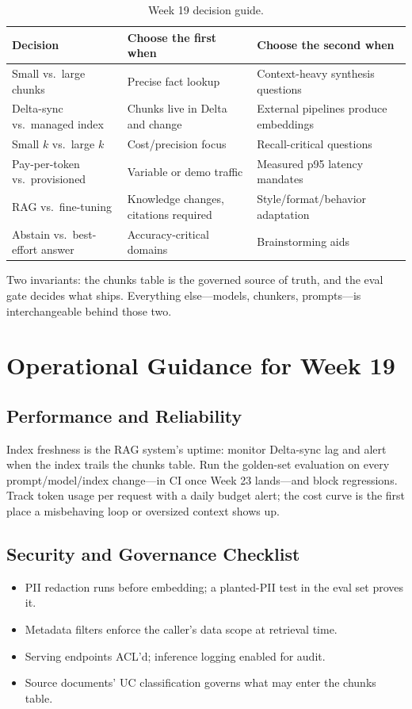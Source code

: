 \begin{table}[H]
\centering
\small
\begin{tabular}{@{}p{3.4cm}p{4.4cm}p{4.6cm}@{}}
\toprule
\textbf{Decision} & \textbf{Choose the first when} & \textbf{Choose the second when} \\
\midrule
Small vs.\ large chunks & Precise fact lookup & Context-heavy synthesis questions \\
Delta-sync vs.\ managed index & Chunks live in Delta and change & External pipelines produce embeddings \\
Small $k$ vs.\ large $k$ & Cost/precision focus & Recall-critical questions \\
Pay-per-token vs.\ provisioned & Variable or demo traffic & Measured p95 latency mandates \\
RAG vs.\ fine-tuning & Knowledge changes, citations required & Style/format/behavior adaptation \\
Abstain vs.\ best-effort answer & Accuracy-critical domains & Brainstorming aids \\
\bottomrule
\end{tabular}
\caption{Week 19 decision guide.}
\label{tab:ch19-decisions}
\end{table}

Two invariants: the chunks table is the governed source of truth, and the eval gate decides what ships. Everything else---models, chunkers, prompts---is interchangeable behind those two.

\section{Operational Guidance for Week 19}
%
\subsection{Performance and Reliability}
Index freshness is the RAG system's uptime: monitor Delta-sync lag and alert when the index trails the chunks table. Run the golden-set evaluation on every prompt/model/index change---in CI once Week 23 lands---and block regressions. Track token usage per request with a daily budget alert; the cost curve is the first place a misbehaving loop or oversized context shows up.

\subsection{Security and Governance Checklist}
\begin{itemize}
    \item PII redaction runs before embedding; a planted-PII test in the eval set proves it.
    \item Metadata filters enforce the caller's data scope at retrieval time.
    \item Serving endpoints ACL'd; inference logging enabled for audit.
    \item Source documents' UC classification governs what may enter the chunks table.
\end{itemize}

